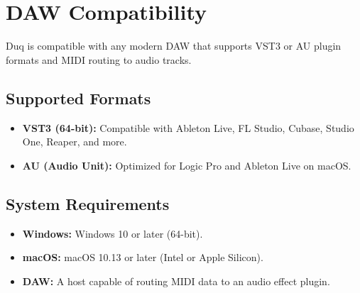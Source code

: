 \chapter{DAW Compatibility}
\label{ch:daw_compatibility}

Duq is compatible with any modern DAW that supports VST3 or AU plugin formats and MIDI routing to audio tracks.

\section{Supported Formats}
\begin{itemize}
    \item \textbf{VST3 (64-bit):} Compatible with Ableton Live, FL Studio, Cubase, Studio One, Reaper, and more.
    \item \textbf{AU (Audio Unit):} Optimized for Logic Pro and Ableton Live on macOS.
\end{itemize}

\section{System Requirements}
\begin{itemize}
    \item \textbf{Windows:} Windows 10 or later (64-bit).
    \item \textbf{macOS:} macOS 10.13 or later (Intel or Apple Silicon).
    \item \textbf{DAW:} A host capable of routing MIDI data to an audio effect plugin.
\end{itemize}
